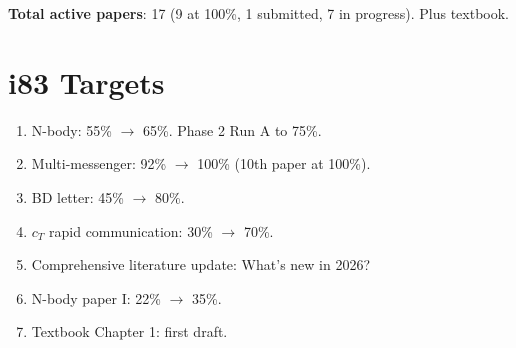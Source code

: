 \documentclass[11pt,a4paper]{article}
\begin{document}
\textbf{Total active papers}: 17 (9 at 100\%, 1 submitted, 7 in progress). Plus textbook.

\section{i83 Targets}

\begin{enumerate}[nosep]
\item N-body: 55\% $\to$ 65\%. Phase 2 Run A to 75\%.
\item Multi-messenger: 92\% $\to$ 100\% (10th paper at 100\%).
\item BD letter: 45\% $\to$ 80\%.
\item $c_T$ rapid communication: 30\% $\to$ 70\%.
\item Comprehensive literature update: What's new in 2026?
\item N-body paper I: 22\% $\to$ 35\%.
\item Textbook Chapter 1: first draft.
\end{enumerate}
\end{document}
